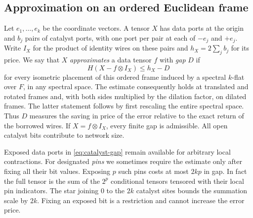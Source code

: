 \subsection{Approximation on an ordered Euclidean frame}

Let $e_1,\ldots,e_k$ be the coordinate vectors. A tensor $X$ has data ports
at the origin and $b_j$ pairs of catalyst ports, with one port per pair at
each of $-e_j$ and $+e_j$. Write $I_X$ for the product of identity wires
on these pairs and $h_X=2\sum_j b_j$ for its price. We say that $X$
\emph{approximates} a data tensor $f$ with \emph{gap} $D$ if
\begin{equation}\label{eq:catalyst-gap}
 H(X-f\otimes I_X)\le h_X-D
\end{equation}
for every isometric placement of this ordered frame induced by a spectral
$k$-flat over $F$, in any spectral space. The estimate consequently holds
at translated and rotated frames and, with both sides multiplied by the
dilation factor, on dilated frames. The latter statement follows by first
rescaling the entire spectral space. Thus $D$ measures the saving in
price of the error relative to the exact return of the borrowed wires.
If $X=f\otimes I_X$, every finite gap is admissible. All open catalyst
bits contribute to network size.

Exposed data ports in \eqref{eq:catalyst-gap} remain available for arbitrary
local contractions. For designated \emph{pins} we sometimes require the
estimate only after fixing all their bit values. Exposing $p$ such pins costs
at most $2kp$ in gap. In fact the full tensor is the sum of the $2^p$
conditional tensors tensored with their local pin indicators. The star
joining $0$ to the $2k$ catalyst sites bounds the summation scale by $2k$.
Fixing an exposed bit is a restriction and cannot increase the error price.

